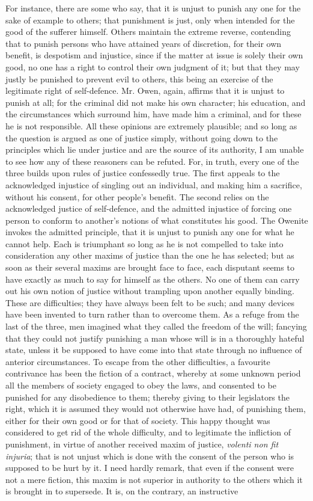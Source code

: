 \documentclass[12pt]{report}
\begin{document}
For instance, there are some who say, that it is unjust to punish any one for the sake of example to others; that punishment is just, only when intended for the good of the sufferer himself. Others maintain the extreme reverse, contending that to punish persons who have attained years of discretion, for their own benefit, is despotism and injustice, since if the matter at issue is solely their own good, no one has a right to control their own judgment of it; but that they may justly be punished to prevent evil to others, this being an exercise of the legitimate right of self-defence. Mr. Owen, again, affirms that it is unjust to punish at all; for the criminal did not make his own character; his education, and the circumstances which surround him, have made him a criminal, and for these he is not responsible. All these opinions are extremely plausible; and so long as the question is argued as one of justice simply, without going down to the principles which lie under justice and are the source of its authority, I am unable to see how any of these reasoners can be refuted. For, in truth, every one of the three builds upon rules of justice confessedly true. The first appeals to the acknowledged injustice of singling out an individual, and making him a sacrifice, without his consent, for other people's benefit. The second relies on the acknowledged justice of self-defence, and the admitted injustice of forcing one person to conform to another's notions of what constitutes his good. The Owenite invokes the admitted principle, that it is unjust to punish any one for what he cannot help. Each is triumphant so long as he is not compelled to take into consideration any other maxims of justice than the one he has selected; but as soon as their several maxims are brought face to face, each disputant seems to have exactly as much to say for himself as the others. No one of them can carry out his own notion of justice without trampling upon another equally binding. These are difficulties; they have always been felt to be such; and many devices have been invented to turn rather than to overcome them. As a refuge from the last of the three, men imagined what they called the freedom of the will; fancying that they could not justify punishing a man whose will is in a thoroughly hateful state, unless it be supposed to have come into that state through no influence of anterior circumstances. To escape from the other difficulties, a favourite contrivance has been the fiction of a contract, whereby at some unknown period all the members of society engaged to obey the laws, and consented to be punished for any disobedience to them; thereby giving to their legislators the right, which it is assumed they would not otherwise have had, of punishing them, either for their own good or for that of society. This happy thought was considered to get rid of the whole difficulty, and to legitimate the infliction of punishment, in virtue of another received maxim of justice, \emph{volenti non fit injuria}; that is not unjust which is done with the consent of the person who is supposed to be hurt by it. I need hardly remark, that even if the consent were not a mere fiction, this maxim is not superior in authority to the others which it is brought in to supersede. It is, on the contrary, an instructive 
\end{document}
